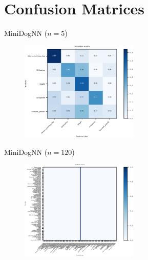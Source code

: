   \section{Confusion Matrices}

  \begin{frame}[noframenumbering]
    \tableofcontents[currentsection]
  \end{frame}

  \begin{frame}{MiniDogNN ($n = 5$)}
    \begin{figure}
      \centering
      \includegraphics[width=0.5\textwidth]{logos/MiniDogNN/confusion_matrix_mini.pdf}
      \label{fig:cm_mini}
    \end{figure}
  \end{frame}

  \begin{frame}{MiniDogNN ($n = 120$)}
    \begin{figure}
      \centering
      \includegraphics[width=0.5\textwidth]{logos/MiniDogNN/confusion_matrix_mini120.pdf}
      \label{fig:cm_mini120}
    \end{figure}
  \end{frame}


